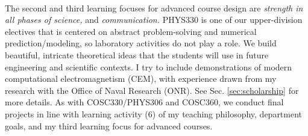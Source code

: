 \documentclass[../../../main.tex]{subfiles}
\begin{document}
\\
\vspace{0.25cm}
The second and third learning focuses for advanced course design are \textit{strength in all phases of science,} and \textit{communication.}  PHYS330 is one of our upper-division electives that is centered on abstract problem-solving and numerical prediction/modeling, so laboratory activities do not play a role.  We build beautiful, intricate theoretical ideas that the students will use in future engineering and scientific contexts.  I try to include demonstrations of modern computational electromagnetism (CEM), with experience drawn from my research with the Office of Naval Research (ONR).  See Sec. \ref{sec:scholarship} for more details.  As with COSC330/PHYS306 and COSC360, we conduct final projects in line with learning activity (6) of my teaching philosophy, department goals, and my third learning focus for advanced courses.
\end{document}
